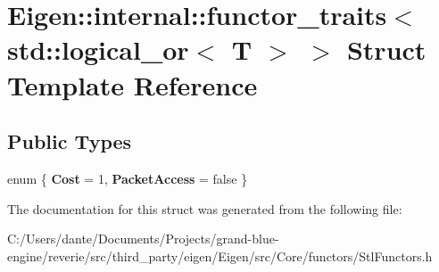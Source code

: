 \hypertarget{struct_eigen_1_1internal_1_1functor__traits_3_01std_1_1logical__or_3_01_t_01_4_01_4}{}\section{Eigen\+::internal\+::functor\+\_\+traits$<$ std\+::logical\+\_\+or$<$ T $>$ $>$ Struct Template Reference}
\label{struct_eigen_1_1internal_1_1functor__traits_3_01std_1_1logical__or_3_01_t_01_4_01_4}
\subsection*{Public Types}
\begin{DoxyCompactItemize}
\item 
\mbox{\label{struct_eigen_1_1internal_1_1functor__traits_3_01std_1_1logical__or_3_01_t_01_4_01_4_a81135c6705490527368cb36440dcf9a0}} 
enum \{ {\bfseries Cost} = 1, 
{\bfseries Packet\+Access} = false
 \}
\end{DoxyCompactItemize}


The documentation for this struct was generated from the following file\+:\begin{DoxyCompactItemize}
\item 
C\+:/\+Users/dante/\+Documents/\+Projects/grand-\/blue-\/engine/reverie/src/third\+\_\+party/eigen/\+Eigen/src/\+Core/functors/Stl\+Functors.\+h\end{DoxyCompactItemize}

